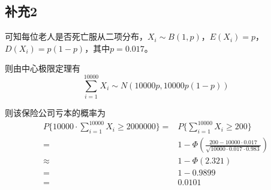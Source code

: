 \documentclass[a4paper,12pt]{ctexart}
\begin{document}
\subsection*{补充2}

可知每位老人是否死亡服从二项分布，$X_i \sim B(1, p)$，$E(X_i) = p$，$D(X_i) = p(1-p)$，其中$p = 0.017$。

则由中心极限定理有
\begin{equation*}
	\sum_{i=1}^{10000} X_i \sim N(10000p, 10000p(1-p))
\end{equation*}

则该保险公司亏本的概率为
\begin{align*}
	P\{10000 \cdot \sum_{i=1}^{10000} X_i \geq 2000000\} =& P\{\sum_{i=1}^{10000} X_i \geq 200\} \\
	=& 1 - \Phi\left(\frac{200 - 10000 \cdot 0.017}{\sqrt{10000 \cdot 0.017 \cdot 0.983}}\right) \\
	\approx& 1 - \Phi(2.321) \\
	=& 1- 0.9899 \\
	=& 0.0101
\end{align*}
\end{document}
